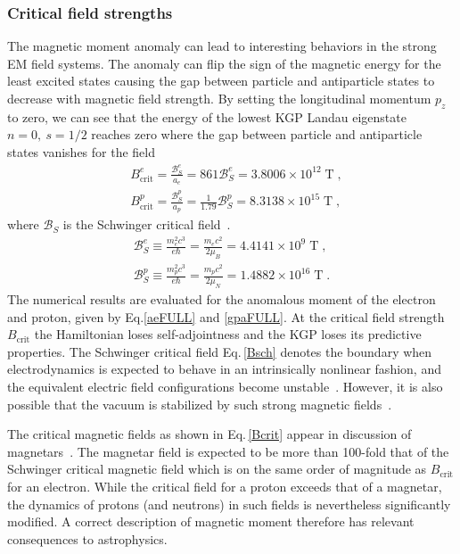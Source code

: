 \subsubsection{Critical field strengths}
\noindent The magnetic moment anomaly can lead to interesting behaviors in the strong EM field systems. The anomaly can flip the sign of the magnetic energy for the least excited states causing the gap between particle and antiparticle states to decrease with magnetic field strength. By setting the longitudinal momentum $p_{z}$ to zero, we can see that the energy of the lowest KGP Landau eigenstate $n=0,\ s=1/2$ reaches zero where the gap between particle and antiparticle states vanishes for the field
\begin{subequations}
\begin{alignat}{1}\label{Bcrit}
&B_\mathrm{crit}^{e}=\frac{\mathcal{B}_{S}^{e}}{a_{e}}=861\mathcal{B}_{S}^{e} =3.8006\times10^{12}\;\mathrm{T}\;,\\
&B_\mathrm{crit}^{p}=\frac{\mathcal{B}_{S}^{p}}{a_{p}}=\frac{1}{1.79}\mathcal{B}_{S}^{p}=8.3138\times10^{15}\;\mathrm{T}\;,
\end{alignat} 
\end{subequations}
where $\mathcal{B}_{S}$ is the Schwinger critical field~\cite{Schwinger:1951nm}.
\begin{subequations}
\begin{alignat}{1}\label{Bsch}
\mathcal{B}_{S}^{e}\equiv\frac{{m_{e}^2}c^3}{e\hbar}=\frac{m_{e}c^2}{2\mu_B}=4.4141\times 10^{9}\;\mathrm{T}\;,\\
\mathcal{B}_{S}^{p}\equiv\frac{{m_{p}^2}c^3}{e\hbar}=\frac{m_{p}c^2}{2\mu_N}=1.4882\times 10^{16}\;\mathrm{T}\;.
\end{alignat}
\end{subequations}
The numerical results are evaluated for the anomalous moment of the electron and proton, given by Eq.\eqref{aeFULL} and \eqref{gpaFULL}. At the critical field strength $B_\mathrm{crit}$ the Hamiltonian loses self-adjointness and the KGP loses its predictive properties. The Schwinger critical field Eq.\,\eqref{Bsch} denotes the boundary when electrodynamics is expected to behave in an intrinsically nonlinear fashion, and the equivalent electric field configurations become unstable~\cite{Labun:2008re}. However, it is also possible that the vacuum is stabilized by such strong magnetic fields~\cite{Evans:2018kor}.

The critical magnetic fields as shown in Eq.\,\eqref{Bcrit} appear in discussion of magnetars~\cite{Kaspi:2017fwg}. The magnetar field is expected to be more than 100-fold that of the Schwinger critical magnetic field which is on the same order of magnitude as $B_\textrm{crit}$ for an electron. While the critical field for a proton exceeds that of a magnetar, the dynamics of protons (and neutrons) in such fields is nevertheless significantly modified. A correct description of magnetic moment therefore has relevant consequences to astrophysics. 

